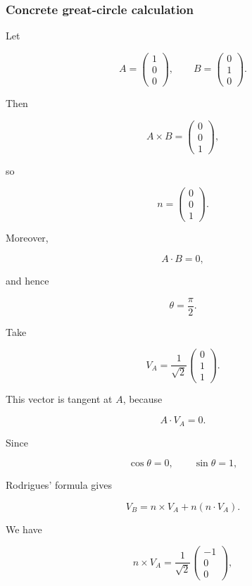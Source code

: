 \documentclass[12pt,a4paper]{article}
\theoremstyle{notespace}
\begin{document}
\subsubsection{Concrete great-circle calculation}

Let

\[
A=
\begin{pmatrix}
	1\\
	0\\
	0
\end{pmatrix},
\qquad
B=
\begin{pmatrix}
	0\\
	1\\
	0
\end{pmatrix}.
\]

Then

\[
A\times B
=
\begin{pmatrix}
	0\\
	0\\
	1
\end{pmatrix},
\]

so

\[
n=
\begin{pmatrix}
	0\\
	0\\
	1
\end{pmatrix}.
\]

Moreover,

\[
A\cdot B=0,
\]

and hence

\[
\theta=\frac{\pi}{2}.
\]

Take

\[
V_A
=
\frac{1}{\sqrt{2}}
\begin{pmatrix}
	0\\
	1\\
	1
\end{pmatrix}.
\]

This vector is tangent at \(A\), because

\[
A\cdot V_A=0.
\]

Since

\[
\cos\theta=0,
\qquad
\sin\theta=1,
\]

Rodrigues' formula gives

\[
V_B
=
n\times V_A+n(n\cdot V_A).
\]

We have

\[
n\times V_A
=
\frac{1}{\sqrt{2}}
\begin{pmatrix}
	-1\\
	0\\
	0
\end{pmatrix},
\]
\end{document}
